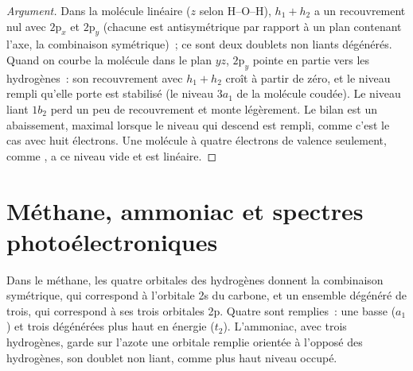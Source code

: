 \begin{proof}[Argument]
Dans la molécule linéaire ($z$ selon H--O--H), $h_1 + h_2$ a un recouvrement nul avec
$2\mathrm p_x$ et $2\mathrm p_y$ (chacune est antisymétrique par rapport à un plan
contenant l'axe, la combinaison symétrique)~; ce sont deux doublets non liants
dégénérés. Quand on courbe la molécule dans le plan $yz$, $2\mathrm p_y$ pointe en partie vers
les hydrogènes~: son recouvrement avec $h_1 + h_2$ croît à partir de zéro, et le niveau rempli
qu'elle porte est stabilisé (le niveau $3a_1$ de la molécule coudée). Le niveau liant
$1b_2$ perd un peu de recouvrement et monte légèrement. Le bilan est un abaissement,
maximal lorsque le niveau qui descend est rempli, comme c'est le cas avec huit électrons. Une
molécule à quatre électrons de valence seulement, comme , a ce niveau
vide et est linéaire.
\end{proof}

\section{Méthane, ammoniac et spectres photoélectroniques}

Dans le méthane, les quatre orbitales des hydrogènes donnent la combinaison symétrique, qui
correspond à l'orbitale 2s du carbone, et un ensemble dégénéré de trois, qui correspond à
ses trois orbitales 2p. Quatre  sont remplies~: une basse ($a_1$) et trois
dégénérées plus haut en énergie ($t_2$). L'ammoniac, avec trois hydrogènes, garde sur l'azote une
orbitale remplie orientée à l'opposé des hydrogènes, son doublet non liant, comme
plus haut niveau occupé.

